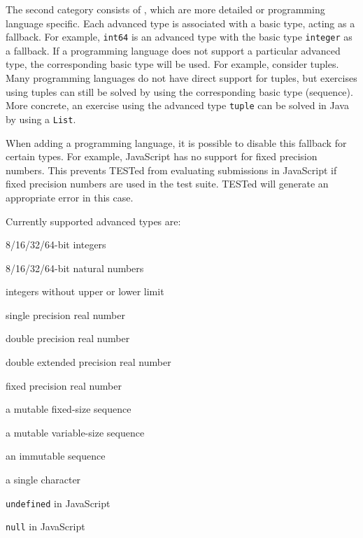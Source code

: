 \documentclass[../main]{subfiles}
\begin{document}
The second category consists of , which are more detailed or programming language specific.
Each advanced type is associated with a basic type, acting as a fallback.
For example, \texttt{int64} is an advanced type with the basic type \texttt{integer} as a fallback.
If a programming language does not support a particular advanced type, the corresponding basic type will be used.
For example, consider tuples.
Many programming languages do not have direct support for tuples, but exercises using tuples can still be solved by using the corresponding basic type (sequence).
More concrete, an exercise using the advanced type \texttt{tuple} can be solved in Java by using a \texttt{List}.

When adding a programming language, it is possible to disable this fallback for certain types.
For example, JavaScript has no support for fixed precision numbers.
This prevents TESTed from evaluating submissions in JavaScript if fixed precision numbers are used in the test suite.
TESTed will generate an appropriate error in this case.

Currently supported advanced types are:

\begin{description}[noitemsep]
    \item[\texttt{int8/16/32/64}] 8/16/32/64-bit integers
    \item[\texttt{uint8/16/32/64}] 8/16/32/64-bit natural numbers
    \item[\texttt{bigint}] integers without upper or lower limit
    \item[\texttt{single\_precision}] single precision real number
    \item[\texttt{double\_precision}] double precision real number
    \item[\texttt{double\_extended}] double extended precision real number
    \item[\texttt{fixed\_precision}] fixed precision real number
    \item[\texttt{array}] a mutable fixed-size sequence
    \item[\texttt{list}] a mutable variable-size sequence
    \item[\texttt{tuple}] an immutable sequence
    \item[\texttt{char}] a single character
    \item[\texttt{undefined}] \texttt{undefined} in JavaScript
    \item[\texttt{null}] \texttt{null} in JavaScript
\end{description}
\end{document}
